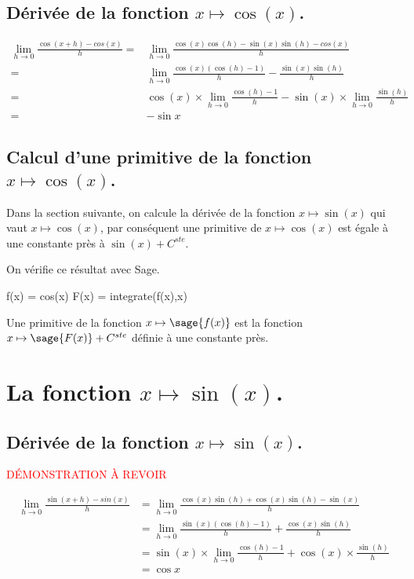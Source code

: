 \documentclass[a4paper,12pt]{report}
\begin{document}
\subsection{Dérivée de la fonction $x \mapsto \cos(x)$.}

\begin{align*}
\lim_{h\to 0} \frac{\cos(x+h)-cos(x)}{h} = &\lim_{h\to 0} \frac{\cos(x)\cos(h)-\sin(x)\sin(h)-cos(x)}{h} \\ =& \lim_{h\to 0} \frac{\cos(x)(\cos(h)-1)}{h}-\frac{\sin(x)\sin(h)}{h}\\  =&  \cos(x) \times \lim_{h\to 0}\frac{\cos(h)-1}{h}- \sin(x) \times \lim_{h\to 0} \frac{\sin(h)}{h}\\  =& -\sin{x}
\end{align*}

\subsection{Calcul d'une primitive de la fonction  $x \mapsto \cos(x)$.}

Dans la section suivante, on calcule la dérivée de la fonction $x \mapsto \sin(x)$ qui vaut $x \mapsto \cos(x)$, par conséquent une primitive de $x \mapsto \cos(x)$ est égale à une constante près à $  \sin(x) + C^{ste} $.

On vérifie ce résultat avec Sage.

\begin{sageblock}
    f(x) = cos(x)
    F(x) = integrate(f(x),x)
\end{sageblock}

Une primitive de la fonction $x \mapsto \sage{f(x)}$  est la fonction $x \mapsto \sage{F(x)} + C^{ste} $ définie à une constante près.


\section{La fonction  $x \mapsto \sin(x)$.}


\subsection{Dérivée de la fonction $x \mapsto \sin(x)$.}

\textcolor{red}{DÉMONSTRATION À REVOIR}

\begin{align*}
\lim_{h\to 0} \frac{\sin(x+h)-sin(x)}{h} & = \lim_{h\to 0} \frac{\cos(x)\sin(h)+\cos(x)\sin(h)-\sin(x)}{h} \\  & =  \lim_{h\to 0} \frac{\sin(x)(\cos(h)-1)}{h}+\frac{\cos(x)\sin(h)}{h} \\ & = \sin(x) \times  \lim_{h\to 0} \frac{\cos(h)-1}{h}+\cos(x) \times \frac{\sin(h)}{h} \\ & = \cos{x}
\end{align*}
\end{document}
